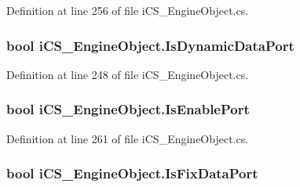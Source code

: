 Definition at line 256 of file i\+C\+S\+\_\+\+Engine\+Object.\+cs.

\hypertarget{classi_c_s___engine_object_a0d484dd85a793563663fd9e1ade85925}{
\subsubsection[{Is\+Dynamic\+Data\+Port}]{\setlength{\rightskip}{0pt plus 5cm}bool i\+C\+S\+\_\+\+Engine\+Object.\+Is\+Dynamic\+Data\+Port\hspace{0.3cm}{\ttfamily [get]}}}\label{classi_c_s___engine_object_a0d484dd85a793563663fd9e1ade85925}


Definition at line 248 of file i\+C\+S\+\_\+\+Engine\+Object.\+cs.

\hypertarget{classi_c_s___engine_object_a0f018184be41b4fc241efc5ae081b9bf}{
\subsubsection[{Is\+Enable\+Port}]{\setlength{\rightskip}{0pt plus 5cm}bool i\+C\+S\+\_\+\+Engine\+Object.\+Is\+Enable\+Port\hspace{0.3cm}{\ttfamily [get]}}}\label{classi_c_s___engine_object_a0f018184be41b4fc241efc5ae081b9bf}


Definition at line 261 of file i\+C\+S\+\_\+\+Engine\+Object.\+cs.

\hypertarget{classi_c_s___engine_object_a413e5dfa90ca85367b2a4e63d18b3598}{
\subsubsection[{Is\+Fix\+Data\+Port}]{\setlength{\rightskip}{0pt plus 5cm}bool i\+C\+S\+\_\+\+Engine\+Object.\+Is\+Fix\+Data\+Port\hspace{0.3cm}{\ttfamily [get]}}}\label{classi_c_s___engine_object_a413e5dfa90ca85367b2a4e63d18b3598}


